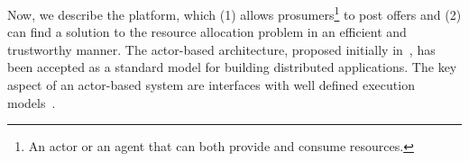 
Now, we describe the \Platform platform, which (1) allows prosumers\footnote{An actor or an agent that can both provide and consume resources.} to post offers and (2) can find a solution to the resource allocation problem in an efficient and trustworthy manner. The actor-based architecture, proposed initially in~\cite{agha1985actors}, has been accepted as a standard model for building distributed applications. The key aspect of an actor-based system are interfaces with well defined execution models~\cite{basu2011rigorous}. 



